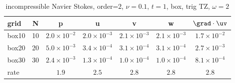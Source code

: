 \begin{table}[hbt]
\begin{center}
\begin{tabular}{|l|c|c|c|c|c|c|} \hline\hline 
grid  & N &  p &  u & v & w & $\grad\cdot\uv$\\ \hline 
               box10 &    10 &  $2.0\times10^{ -2}$  &  $2.0\times10^{ -3}$  &  $2.1\times10^{ -3}$  &  $2.1\times10^{ -3}$  &  $1.7\times10^{ -2}$   \\ \hline
               box20 &    20 &  $5.0\times10^{ -3}$  &  $3.4\times10^{ -4}$  &  $3.1\times10^{ -4}$  &  $3.1\times10^{ -4}$  &  $2.7\times10^{ -3}$   \\ \hline
               box30 &    30 &  $2.4\times10^{ -3}$  &  $1.3\times10^{ -4}$  &  $1.0\times10^{ -4}$  &  $1.0\times10^{ -4}$  &  $8.1\times10^{ -4}$   \\ \hline
    rate            &     &       $1.9$ &       $2.5$ &       $2.8$ &       $2.8$ &       $2.8$  \\ \hline\hline
\end{tabular}
\caption{incompressible Navier Stokes, order=$2$, $\nu=0.1$, $t=1$, box, trig TZ, $\omega=2$}\label{table:ins.box}
\end{center}
\end{table}

